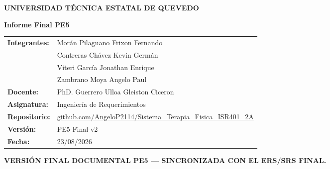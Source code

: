 \documentclass[12pt,a4paper]{article}
\begin{document}
\begin{titlepage}
\centering
{\Large\bfseries UNIVERSIDAD TÉCNICA ESTATAL DE QUEVEDO\par}
\vspace{0.3cm}{\large Facultad de Ciencias de la Computación — Ingeniería de Software\par}
\vspace{1.5cm}
{\Huge\bfseries Informe Final PE5\par}
\vspace{0.3cm}{\Large Integración, Métricas y Defensa del Proyecto Integrador\par}
\vspace{1cm}{\LARGE\bfseries Sistema Inteligente de Control y Seguimiento de Terapia Física — SICST\par}
\vfill
\begin{tabular}{ll}
\textbf{Integrantes:} & Morán Pilaguano Frixon Fernando\\
& Contreras Chávez Kevin Germán\\
& Viteri García Jonathan Enrique\\
& Zambrano Moya Angelo Paul\\[0.3cm]
\textbf{Docente:} & PhD. Guerrero Ulloa Gleiston Ciceron\\
\textbf{Asignatura:} & Ingeniería de Requerimientos\\
\textbf{Repositorio:} & \href{https://github.com/AngeloP2114/Sistema_Terapia_Fisica_ISR401_2A}{github.com/AngeloP2114/Sistema\_Terapia\_Fisica\_ISR401\_2A}\\
\textbf{Versión:} & PE5-Final-v2\\
\textbf{Fecha:} & 23/08/2026\\
\end{tabular}
\vfill
{\bfseries VERSIÓN FINAL DOCUMENTAL PE5 — SINCRONIZADA CON EL ERS/SRS FINAL.}
\end{titlepage}
\end{document}
